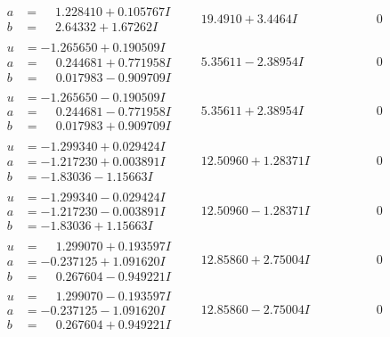\documentclass[1p]{elsarticle_modified}
\theoremstyle{definition}
\begin{document}
$$\begin{array}{c|c|c}
\begin{aligned}
a &= \phantom{-}1.228410 + 0.105767 I \\
b &= \phantom{-}2.64332 + 1.67262 I\end{aligned}
 & \phantom{-}19.4910 + 3.4464 I & \phantom{-0.000000 } 0 \\ \hline\begin{aligned}
u &= -1.265650 + 0.190509 I \\
a &= \phantom{-}0.244681 + 0.771958 I \\
b &= \phantom{-}0.017983 - 0.909709 I\end{aligned}
 & \phantom{-}5.35611 - 2.38954 I & \phantom{-0.000000 } 0 \\ \hline\begin{aligned}
u &= -1.265650 - 0.190509 I \\
a &= \phantom{-}0.244681 - 0.771958 I \\
b &= \phantom{-}0.017983 + 0.909709 I\end{aligned}
 & \phantom{-}5.35611 + 2.38954 I & \phantom{-0.000000 } 0 \\ \hline\begin{aligned}
u &= -1.299340 + 0.029424 I \\
a &= -1.217230 + 0.003891 I \\
b &= -1.83036 - 1.15663 I\end{aligned}
 & \phantom{-}12.50960 + 1.28371 I & \phantom{-0.000000 } 0 \\ \hline\begin{aligned}
u &= -1.299340 - 0.029424 I \\
a &= -1.217230 - 0.003891 I \\
b &= -1.83036 + 1.15663 I\end{aligned}
 & \phantom{-}12.50960 - 1.28371 I & \phantom{-0.000000 } 0 \\ \hline\begin{aligned}
u &= \phantom{-}1.299070 + 0.193597 I \\
a &= -0.237125 + 1.091620 I \\
b &= \phantom{-}0.267604 - 0.949221 I\end{aligned}
 & \phantom{-}12.85860 + 2.75004 I & \phantom{-0.000000 } 0 \\ \hline\begin{aligned}
u &= \phantom{-}1.299070 - 0.193597 I \\
a &= -0.237125 - 1.091620 I \\
b &= \phantom{-}0.267604 + 0.949221 I\end{aligned}
 & \phantom{-}12.85860 - 2.75004 I & \phantom{-0.000000 } 0 \\ \hline\begin{aligned}

\end{aligned}
\end{array}$$
\end{document}
